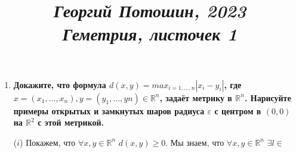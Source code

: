 \documentclass{article}
\title{
\textit{\small{Георгий Потошин, 2023}}\\
\vspace{0.3ex}
\textit{\huge{Геметрия, листочек 1}}\vspace{1ex}
}
\date{\vspace{-10ex}}
\begin{document}
\maketitle

\begin{enumerate}
    \item \textbf{Докажите, что формула $d(x,y)= max_{i=1,...,n} |x_i−y_i|$,
        где $x=(x_1,...,x_n),y=(y_1,...,yn)\in\mathbb{R}^n$, задаёт метрику в
        $\mathbb{R}^n$. Нарисуйте примеры открытых и замкнутых шаров радиуса
        $\varepsilon$ с центром в $(0,0)$ на $\mathbb{R}^2$ с этой метрикой.}\par
        ($i$) Покажем, что $\forall x,y\in\mathbb{R}^n$ $d(x,y)\geqslant 0$. Мы
        знаем, что $\forall x,y\in\mathbb{R}^n$ $\exists l\in$
\end{enumerate}
\end{document}
